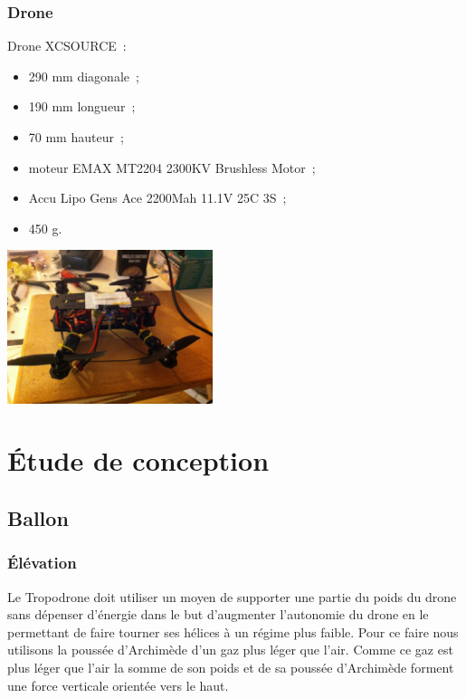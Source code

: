 \documentclass[a4paper,11pt]{article}
\begin{document}
\subsubsection{Drone}
\begin{multicols}{2}
	Drone XCSOURCE~: \\
	\begin{itemize}
		\item 290 mm diagonale~;
		\item 190 mm longueur~;
		\item 70 mm hauteur~;
		\item moteur EMAX MT2204 2300KV Brushless Motor~;
		\item Accu Lipo Gens Ace 2200Mah 11.1V 25C 3S~;
		\item 450 g.
	\end{itemize}
	\begin{center}
		\includegraphics[width=6cm]{../Images/drone.JPG}
	\end{center}
\end{multicols}

\newpage

\section{Étude de conception}

\subsection{Ballon}

\subsubsection{Élévation}

Le Tropodrone doit utiliser un moyen de supporter une partie du poids du drone sans dépenser d'énergie dans le but d'augmenter l'autonomie du drone en le permettant de faire tourner ses hélices à un régime plus faible. Pour ce faire nous utilisons la poussée d'Archimède d'un gaz plus léger que l'air. Comme ce gaz est plus léger que l'air la somme de son poids et de sa poussée d'Archimède forment une force verticale orientée vers le haut.
\end{document}
